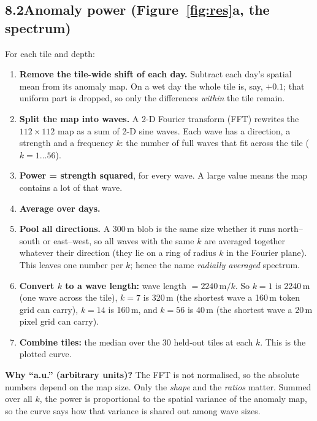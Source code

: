 \documentclass[11pt,a4paper]{article}
\begin{document}
\subsection*{8.2\quad Anomaly power (Figure~\ref{fig:res}a, the spectrum)}
For each tile and depth:
\begin{enumerate}
\item \textbf{Remove the tile-wide shift of each day.} Subtract each day's spatial mean from its anomaly map.
      On a wet day the whole tile is, say, $+0.1$; that uniform part is dropped, so only the differences
      \emph{within} the tile remain.
\item \textbf{Split the map into waves.} A 2-D Fourier transform (FFT) rewrites the $112 \times 112$ map as a sum of
      2-D sine waves. Each wave has a direction, a strength and a frequency $k$: the number of full waves that fit
      across the tile ($k = 1 \ldots 56$).
\item \textbf{Power = strength squared}, for every wave. A large value means the map contains a lot of that wave.
\item \textbf{Average over days.}
\item \textbf{Pool all directions.} A 300\,m blob is the same size whether it runs north--south or east--west, so all
      waves with the same $k$ are averaged together whatever their direction (they lie on a ring of radius $k$ in
      the Fourier plane). This leaves one number per $k$; hence the name \emph{radially averaged} spectrum.
\item \textbf{Convert $k$ to a wave length:} wave length $= 2240\,\mathrm{m} / k$. So $k=1$ is 2240\,m (one wave across the tile),
      $k=7$ is 320\,m (the shortest wave a 160\,m token grid can carry), $k=14$ is 160\,m, and $k=56$ is 40\,m (the shortest
      wave a 20\,m pixel grid can carry).
\item \textbf{Combine tiles:} the median over the 30 held-out tiles at each $k$. This is the plotted curve.
\end{enumerate}
\textbf{Why ``a.u.'' (arbitrary units)?} The FFT is not normalised, so the absolute numbers depend on the map size.
Only the \emph{shape} and the \emph{ratios} matter. Summed over all $k$, the power is proportional to the spatial
variance of the anomaly map, so the curve says how that variance is shared out among wave sizes.
\end{document}
